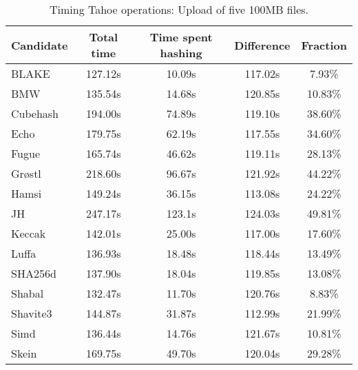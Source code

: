 \begin{table}[h]
  \centering
  \begin{tabular}{ | l | c | c | c | c | }
    \hline
    Candidate & Total time & Time spent hashing & Difference & Fraction \\ \hline
    BLAKE     &  127.12s  &  10.09s  &  117.02s  &  7.93\%   \\  \hline
    BMW       &  135.54s  &  14.68s  &  120.85s  &  10.83\%  \\  \hline
    Cubehash  &  194.00s  &  74.89s  &  119.10s  &  38.60\%  \\  \hline
    Echo      &  179.75s  &  62.19s  &  117.55s  &  34.60\%  \\  \hline
    Fugue     &  165.74s  &  46.62s  &  119.11s  &  28.13\%  \\  \hline
    Grøstl    &  218.60s  &  96.67s  &  121.92s  &  44.22\%  \\  \hline
    Hamsi     &  149.24s  &  36.15s  &  113.08s  &  24.22\%  \\  \hline
    JH        &  247.17s  &  123.1s  &  124.03s  &  49.81\%  \\  \hline
    Keccak    &  142.01s  &  25.00s  &  117.00s  &  17.60\%  \\  \hline
    Luffa     &  136.93s  &  18.48s  &  118.44s  &  13.49\%  \\  \hline
    SHA256d   &  137.90s  &  18.04s  &  119.85s  &  13.08\%  \\  \hline
    Shabal    &  132.47s  &  11.70s  &  120.76s  &  8.83\%   \\  \hline
    Shavite3  &  144.87s  &  31.87s  &  112.99s  &  21.99\%  \\  \hline
    Simd      &  136.44s  &  14.76s  &  121.67s  &  10.81\%  \\  \hline
    Skein     &  169.75s  &  49.70s  &  120.04s  &  29.28\%  \\  \hline
  \end{tabular}
  \caption{Timing Tahoe operations: Upload of five 100MB files.}
  \label{tbl:hashingtimes:put100mb}
\end{table}

